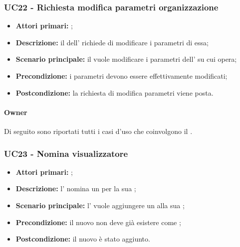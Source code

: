 \documentclass[casi-duso]{subfiles}
\begin{document}
\subsubsection{UC22 - Richiesta modifica parametri organizzazione}
\label{subsub:UC22}
\begin{itemize}
  \item \textbf{Attori primari:} ;
  \item \textbf{Descrizione:} il  dell' richiede di modificare i parametri di essa;
  \item \textbf{Scenario principale:} il  vuole modificare i parametri dell' su cui opera;
  \item \textbf{Precondizione:} i parametri devono essere effettivamente modificati;
  \item \textbf{Postcondizione:} la richiesta di modifica parametri viene posta.
\end{itemize}

\paragraph{Owner}
Di seguito sono riportati tutti i casi d'uso che coinvolgono il  .

\subsubsection{UC23 - Nomina visualizzatore}
\label{subsub:UC23}
\begin{itemize}
  \item \textbf{Attori primari:} ;
  \item \textbf{Descrizione:} l'  nomina un  per la sua ;
  \item \textbf{Scenario principale:} l'  vuole aggiungere un  alla sua ;
  \item \textbf{Precondizione:} il nuovo  non deve già esistere come ;
  \item \textbf{Postcondizione:} il nuovo  è stato aggiunto.
\end{itemize}
\end{document}
